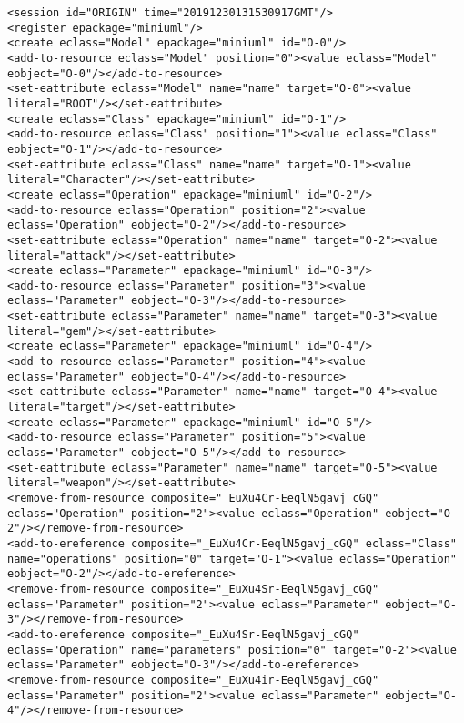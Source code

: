 \vspace{-20pt}
\begin{lstlisting}[style=cbpfile,caption={Change-based representation of the model in Figure \ref{fig:class_diagram_left}.},label=lst:class_diagram_left_cbpfile]
<session id="ORIGIN" time="20191230131530917GMT"/>
<register epackage="miniuml"/>
<create eclass="Model" epackage="miniuml" id="O-0"/>
<add-to-resource eclass="Model" position="0"><value eclass="Model" eobject="O-0"/></add-to-resource>
<set-eattribute eclass="Model" name="name" target="O-0"><value literal="ROOT"/></set-eattribute>
<create eclass="Class" epackage="miniuml" id="O-1"/>
<add-to-resource eclass="Class" position="1"><value eclass="Class" eobject="O-1"/></add-to-resource>
<set-eattribute eclass="Class" name="name" target="O-1"><value literal="Character"/></set-eattribute>
<create eclass="Operation" epackage="miniuml" id="O-2"/>
<add-to-resource eclass="Operation" position="2"><value eclass="Operation" eobject="O-2"/></add-to-resource>
<set-eattribute eclass="Operation" name="name" target="O-2"><value literal="attack"/></set-eattribute>
<create eclass="Parameter" epackage="miniuml" id="O-3"/>
<add-to-resource eclass="Parameter" position="3"><value eclass="Parameter" eobject="O-3"/></add-to-resource>
<set-eattribute eclass="Parameter" name="name" target="O-3"><value literal="gem"/></set-eattribute>
<create eclass="Parameter" epackage="miniuml" id="O-4"/>
<add-to-resource eclass="Parameter" position="4"><value eclass="Parameter" eobject="O-4"/></add-to-resource>
<set-eattribute eclass="Parameter" name="name" target="O-4"><value literal="target"/></set-eattribute>
<create eclass="Parameter" epackage="miniuml" id="O-5"/>
<add-to-resource eclass="Parameter" position="5"><value eclass="Parameter" eobject="O-5"/></add-to-resource>
<set-eattribute eclass="Parameter" name="name" target="O-5"><value literal="weapon"/></set-eattribute>
<remove-from-resource composite="_EuXu4Cr-EeqlN5gavj_cGQ" eclass="Operation" position="2"><value eclass="Operation" eobject="O-2"/></remove-from-resource>
<add-to-ereference composite="_EuXu4Cr-EeqlN5gavj_cGQ" eclass="Class" name="operations" position="0" target="O-1"><value eclass="Operation" eobject="O-2"/></add-to-ereference>
<remove-from-resource composite="_EuXu4Sr-EeqlN5gavj_cGQ" eclass="Parameter" position="2"><value eclass="Parameter" eobject="O-3"/></remove-from-resource>
<add-to-ereference composite="_EuXu4Sr-EeqlN5gavj_cGQ" eclass="Operation" name="parameters" position="0" target="O-2"><value eclass="Parameter" eobject="O-3"/></add-to-ereference>
<remove-from-resource composite="_EuXu4ir-EeqlN5gavj_cGQ" eclass="Parameter" position="2"><value eclass="Parameter" eobject="O-4"/></remove-from-resource>

\end{lstlisting}
